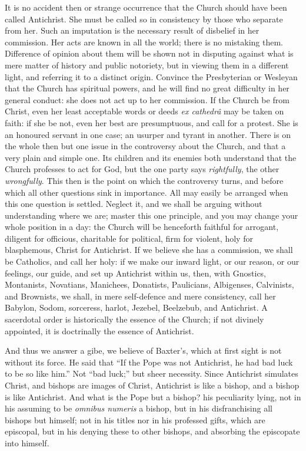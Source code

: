 It is no accident then or strange occurrence that the Church should
have been called Antichrist. She must be called so in consistency by
those who separate from her. Such an imputation is the necessary
result of disbelief in her commission. Her acts are known in all the
world; there is no mistaking them. Difference of opinion about them
will be shown not in disputing against what is mere matter of history
and public notoriety, but in viewing them in a different light, and
referring it to a distinct origin. Convince the Presbyterian or
Wesleyan that the Church has spiritual powers, and he will find no
great difficulty in her general conduct: she does not act up to her
commission. If the Church be from Christ, even her least acceptable
words or deeds \emph{ex cathedrâ} may be taken on faith: if she be
not, even her best are presumptuous, and call for a protest. She is an
honoured servant in one case; an usurper and tyrant in another. There
is on the whole then but one issue in the controversy about the
Church, and that a very plain and simple one. Its children and its
enemies both understand that the Church professes to act for God, but
the one party says \emph{rightfully}, the other \emph{wrongfully}.
This then is the point on which the controversy turns, and before
which all other questions sink in importance. All may easily be
arranged when this one question is settled. Neglect it, and we shall
be arguing without understanding where we are; master this one
principle, and you may change your whole position in a day: the Church
will be henceforth faithful for arrogant, diligent for officious,
charitable for political, firm for violent, holy for blasphemous,
Christ for Antichrist. If we believe she has a commission, we shall be Catholics, and call her holy: if we make our inward light, or
our reason, or our feelings, our guide, and set up Antichrist within
us, then, with Gnostics, Montanists, Novatians, Manichees, Donatists,
Paulicians, Albigenses, Calvinists, and Brownists, we shall, in mere
self-defence and mere consistency, call her Babylon, Sodom, sorceress,
harlot, Jezebel, Beelzebub, and Antichrist. A sacerdotal order is
historically the essence of the Church; if not divinely appointed, it
is doctrinally the essence of Antichrist.

And thus we answer a gibe, we believe of Baxter's, which at first
sight is not without its force. He said that ``If the Pope was not
Antichrist, he had bad luck to be so like him.'' Not ``bad
luck;'' but sheer necessity. Since Antichrist simulates Christ,
and bishops are images of Christ, Antichrist is like a bishop, and a
bishop is like Antichrist. And what is the Pope but a bishop? his
peculiarity lying, not in his assuming to be \emph{omnibus numeris} a
bishop, but in his disfranchising all bishops but himself; not in his
titles nor in his professed gifts, which are episcopal, but in his
denying these to other bishops, and absorbing the episcopate into
himself.

